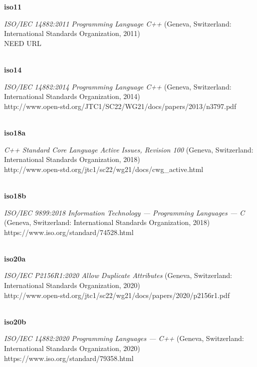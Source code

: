 \noindent\textbf{iso11}\\
\hspace*{2em}\parbox[t]{\textwidth}{\textit{ISO/IEC 14882:2011 Programming Language C++} (Geneva, Switzerland: International Standards Organization, 2011)\\ 
NEED URL}\\

\noindent\textbf{iso14}\\
\hspace*{2em}\parbox[t]{\textwidth}{\textit{ISO/IEC 14882:2014 Programming Language C++} (Geneva, Switzerland: International Standards Organization, 2014)\\ 
http://www.open-std.org/JTC1/SC22/WG21/docs/papers/2013/n3797.pdf}\\

\noindent\textbf{iso18a}\\
\hspace*{2em}\parbox[t]{\textwidth}{\textit{C++ Standard Core Language Active Issues, Revision 100} (Geneva, Switzerland: International Standards Organization, 2018)\\
http://www.open-std.org/jtc1/sc22/wg21/docs/cwg\_active.html}\\

\noindent\textbf{iso18b}\\
\hspace*{2em}\parbox[t]{\textwidth}{\textit{ISO/IEC 9899:2018 Information Technology ---
Programming Languages --- C} (Geneva, Switzerland: International Standards Organization, 2018)\\ 
https://www.iso.org/standard/74528.html}\\

\noindent\textbf{iso20a}\\
\hspace*{2em}\parbox[t]{\textwidth}{\textit{ISO/IEC P2156R1:2020 Allow Duplicate Attributes} (Geneva, Switzerland: International Standards Organization, 2020)\\
http://www.open-std.org/jtc1/sc22/wg21/docs/papers/2020/p2156r1.pdf}\\

\noindent\textbf{iso20b}\\
\hspace*{2em}\parbox[t]{\textwidth}{\textit{ISO/IEC 14882:2020 Programming Languages --- C++} (Geneva, Switzerland: International Standards Organization, 2020)\\ 
https://www.iso.org/standard/79358.html}\\

